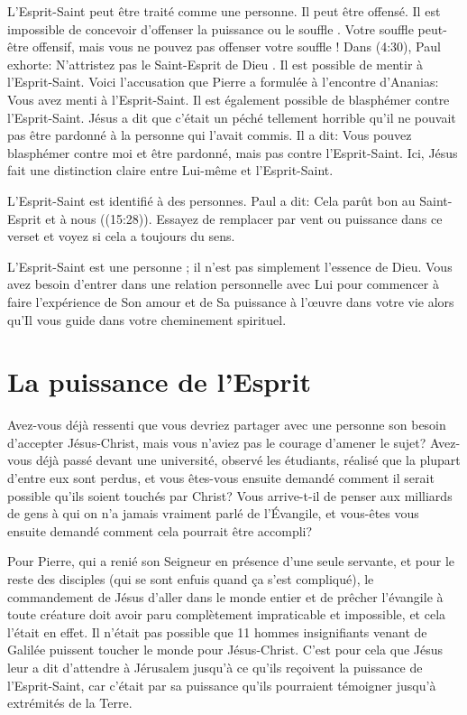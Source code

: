 L'Esprit-Saint peut être traité comme une personne. Il peut être offensé.
 Il est impossible de concevoir d'offenser \og la puissance \fg{} ou
 \og le souffle \fg{}. Votre souffle peut-être offensif, mais vous ne pouvez
 pas offenser votre souffle ! Dans (4:30), Paul exhorte\space:
 \og N'attristez pas le Saint-Esprit de Dieu \fg{}.
 Il est possible de mentir à l'Esprit-Saint. Voici l'accusation que Pierre a
 formulée à l'encontre d'Ananias\space:
 \og Vous avez menti à l'Esprit-Saint. \fg{}
 Il est également possible de blasphémer contre l'Esprit-Saint.
 Jésus a dit que c'était un péché tellement horrible qu'il ne pouvait pas
 être pardonné à la personne qui l'avait commis. Il a dit\space:
 \og Vous pouvez blasphémer contre moi et être pardonné, mais pas contre
 l'Esprit-Saint. \fg{}
 Ici, Jésus fait une distinction claire entre Lui-même et l'Esprit-Saint.

L'Esprit-Saint est identifié à des personnes. Paul a dit\space:
 \og Cela parût bon au Saint-Esprit et à nous \fg{}
 ((15:28)).
 Essayez de remplacer par vent ou puissance dans ce verset et voyez si cela
 a toujours du sens.

L'Esprit-Saint est une personne ; il n'est pas simplement l'essence de Dieu.
 Vous avez besoin d'entrer dans une relation personnelle avec Lui pour
 commencer à faire l'expérience de Son amour et de Sa puissance à l'œuvre
 dans votre vie alors qu'Il vous guide dans votre cheminement spirituel.


\section*{La puissance de l'Esprit}

Avez-vous déjà ressenti que vous devriez partager avec une personne son
 besoin d'accepter Jésus-Christ, mais vous n'aviez pas le courage d'amener
 le sujet?
 Avez-vous déjà passé devant une université, observé les étudiants,
 réalisé que la plupart d'entre eux sont perdus, et vous êtes-vous ensuite
 demandé comment il serait possible qu'ils soient touchés par Christ?
 Vous arrive-t-il de penser aux milliards de gens à qui on n'a jamais vraiment
 parlé de l'Évangile, et vous-êtes vous ensuite demandé comment cela pourrait
 être accompli?

Pour Pierre, qui a renié son Seigneur en présence d'une seule servante,
 et pour le reste des disciples (qui se sont enfuis quand ça s'est compliqué),
 le commandement de Jésus d'aller dans le monde entier et de prêcher
 l'évangile à toute créature doit avoir paru complètement impraticable et
 impossible, et cela l'était en effet.
 Il n'était pas possible que 11 hommes insignifiants venant de Galilée
 puissent toucher le monde pour Jésus-Christ.
 C'est pour cela que Jésus leur a dit d'attendre à Jérusalem jusqu'à ce
 qu'ils reçoivent la puissance de l'Esprit-Saint, car c'était par sa puissance
 qu'ils pourraient témoigner jusqu'à extrémités de la Terre.

